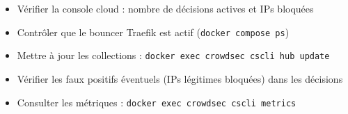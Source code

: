 \documentclass[11pt, a4paper]{article}
\begin{document}
\begin{checklist}
  \begin{itemize}
    \item[$\square$] Vérifier la console cloud : nombre de décisions actives et IPs bloquées
    \item[$\square$] Contrôler que le bouncer Traefik est actif (\texttt{docker compose ps})
    \item[$\square$] Mettre à jour les collections : \texttt{docker exec crowdsec cscli hub update}
    \item[$\square$] Vérifier les faux positifs éventuels (IPs légitimes bloquées) dans les décisions
    \item[$\square$] Consulter les métriques : \texttt{docker exec crowdsec cscli metrics}
  \end{itemize}
\end{checklist}
\end{document}
